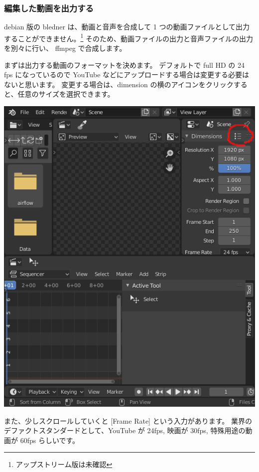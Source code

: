 \documentclass[mingoth,a4paper]{jsarticle}
\begin{document}
\subsubsection{編集した動画を出力する}

debian 版の bledner は、動画と音声を合成して 1 つの動画ファイルとして出力することができません。\footnote{アップストリーム版は未確認}
そのため、動画ファイルの出力と音声ファイルの出力を別々に行い、
ffmpeg で合成します。

まずは出力する動画のフォーマットを決めます。
デフォルトで full HD の 24 fps になっているので YouTube などにアップロードする場合は変更する必要はないと思います。
変更する場合は、dimension の横のアイコンをクリックすると、任意のサイズを選択できます。

\begin{center}
\includegraphics[scale=0.3]{image202209/blender_video_size.png}
\end{center}

また、少しスクロールしていくと [Frame Rate] という入力があります。
業界のデファクトスタンダードとして、YouTube が 24fps, 映画が 30fps, 特殊用途の動画が 60fps らしいです。 
\end{document}
